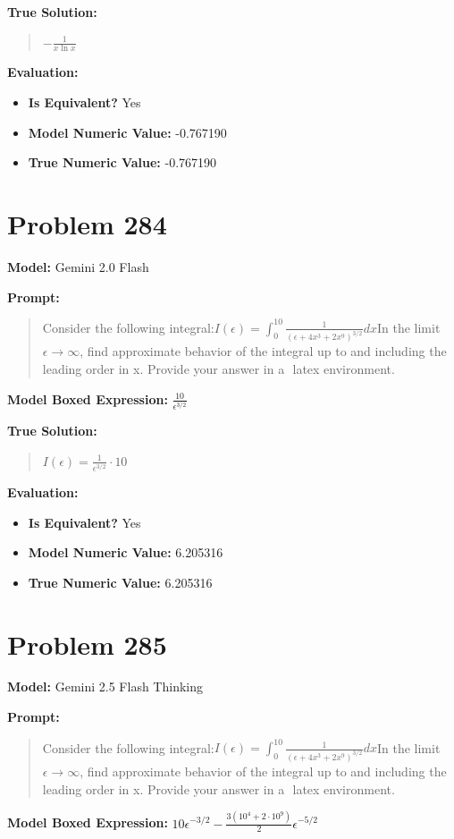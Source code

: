 \documentclass{article}
\begin{document}
{\textbf{True Solution:}
\begin{quote}
$-\frac{1}{x \ln x}$
\end{quote}

\textbf{Evaluation:}
\begin{itemize}
\item \textbf{Is Equivalent?} Yes
\item \textbf{Model Numeric Value:} -0.767190
\item \textbf{True Numeric Value:} -0.767190
\end{itemize}
\vspace{1cm}
\section*{Problem 284}
\textbf{Model:} Gemini 2.0 Flash

\textbf{Prompt:}
\begin{quote}
Consider the following integral:$I(\epsilon) = \int_0^{10} \frac{1}{(\epsilon + 4x^3 + 2x^9)^{3/2}} dx$In the limit$\epsilon \rightarrow \infty$, find approximate behavior of the integral up to and including the leading order in x. Provide your answer in a $\boxed{}$ latex environment.
\end{quote}
\textbf{Model Boxed Expression:} $\frac{10}{\epsilon^{3/2}}$

\textbf{True Solution:}
\begin{quote}
$I(\epsilon) = \frac{1}{\epsilon^{3/2}} \cdot 10$
\end{quote}

\textbf{Evaluation:}
\begin{itemize}
\item \textbf{Is Equivalent?} Yes
\item \textbf{Model Numeric Value:} 6.205316
\item \textbf{True Numeric Value:} 6.205316
\end{itemize}
\vspace{1cm}
\section*{Problem 285}
\textbf{Model:} Gemini 2.5 Flash Thinking

\textbf{Prompt:}
\begin{quote}
Consider the following integral:$I(\epsilon) = \int_0^{10} \frac{1}{(\epsilon + 4x^3 + 2x^9)^{3/2}} dx$In the limit$\epsilon \rightarrow \infty$, find approximate behavior of the integral up to and including the leading order in x. Provide your answer in a $\boxed{}$ latex environment.
\end{quote}
\textbf{Model Boxed Expression:} $10\epsilon^{-3/2} - \frac{3(10^4 + 2 \cdot 10^9)}{2}\epsilon^{-5/2}$

}
\end{document}
